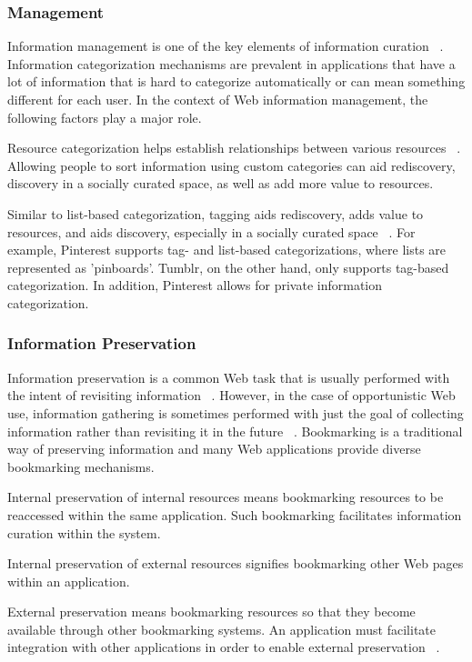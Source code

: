 {{{\subsubsection{Management}
Information management is one of the key elements of information curation ~\cite{beagrie, wittaker}. Information categorization mechanisms are prevalent in applications that have a lot of information that is hard to categorize automatically or can mean something different for each user. In the context of Web information management, the following factors play a major role.

Resource categorization helps establish relationships between various resources ~\cite{beagrie, wittaker}. Allowing people to sort information using custom categories can aid rediscovery, discovery in a socially curated space, as well as add more value to resources.

Similar to list-based categorization, tagging aids rediscovery, adds value to resources, and aids discovery, especially in a socially curated space ~\cite{gruber}.  For example, Pinterest supports tag- and list-based categorizations, where lists are represented as 'pinboards'. Tumblr, on the other hand, only supports tag-based categorization. In addition, Pinterest allows for private information categorization.

} %

{\subsubsection{Information Preservation}
Information preservation is a common Web task that is usually performed with the intent of revisiting information ~\cite{abrams, wittaker}. However, in the case of opportunistic Web use, information gathering is sometimes performed with just the goal of collecting information rather than revisiting it in the future ~\cite{lindley}. Bookmarking is a traditional way of preserving information and many Web applications provide diverse bookmarking mechanisms. 

Internal preservation of internal resources means bookmarking resources to be reaccessed within the same application. Such bookmarking facilitates information curation within the system.

Internal preservation of external resources signifies bookmarking other Web pages within an application. 
  
External preservation means bookmarking resources so that they become available through other bookmarking systems. An application must facilitate integration with other applications in order to enable external preservation ~\cite{abrams}.

}}}
